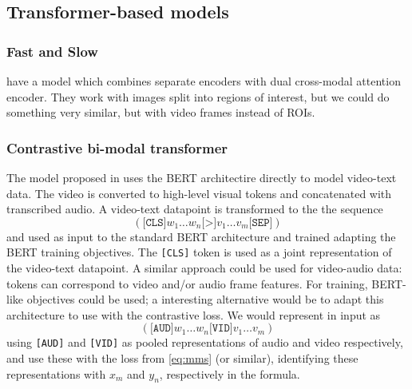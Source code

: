 \subsection{Transformer-based models}
\subsubsection{Fast and Slow}
\citet{peng2021fastslow} have a model which combines separate encoders
with dual cross-modal attention encoder. They work with images split
into regions of interest, but we could do something very similar, but
with video frames instead of ROIs.

\subsubsection{Contrastive bi-modal transformer}
\label{sec:cbmt}
The model proposed in \citet{sun2019videobert} uses the BERT
architectire directly to model video-text data. The video is converted
to high-level visual tokens and concatenated with transcribed audio. A
video-text datapoint is transformed to the the sequence
$$(\texttt{[CLS]} w_1\ldots w_n \texttt{[>]} v_1 \dots v_m
\texttt{[SEP]})$$ and used as input to the standard BERT architecture
and trained adapting the BERT training objectives. The \texttt{[CLS]}
token is used as a joint representation of the video-text datapoint. A
similar approach could be used for video-audio data: tokens can
correspond to video and/or audio frame features. For training,
BERT-like objectives could be used; a interesting alternative would be
to adapt this architecture to use with the contrastive loss. We would
represent in input as
$$(\texttt{[AUD]} w_1\ldots w_n \texttt{[VID]} v_1 \dots v_m)$$ using
\texttt{[AUD]} and \texttt{[VID]} as pooled representations of audio
and video respectively, and use these with the loss from \cref{eq:mms}
(or similar), identifying these representations with $x_m$ and $y_n$, respectively
in the formula.


